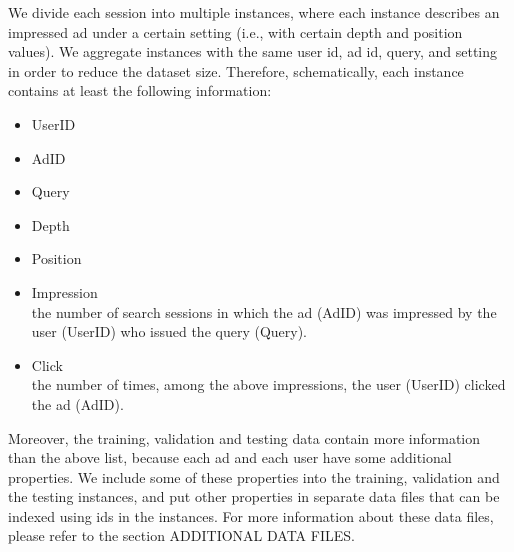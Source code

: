 \documentclass[10pt,a4paper]{ctexbook}
\begin{document}
We divide each session into multiple instances, where each instance describes an impressed ad under a certain setting  (i.e., with certain depth and position values). We aggregate instances with the same user id, ad id, query, and setting in order to reduce the dataset size. Therefore, schematically, each instance contains at least the following information:

\begin{itemize}
\item UserID 
\item AdID 
\item Query 
\item Depth 
\item Position 
\item Impression\\
the number of search sessions in which the ad (AdID) was impressed by the user (UserID) who issued the query (Query).
\item Click \\
the number of times, among the above impressions, the user (UserID) clicked the ad (AdID).   
\end{itemize}

Moreover, the training, validation and testing data contain more information than the above list, because each ad and each user have some additional properties. We include some of these properties into the training, validation and the testing instances, and put other properties in separate data files that can be indexed using ids in the instances. For more information about these data files, please refer to the section ADDITIONAL DATA FILES. 
\end{document}
